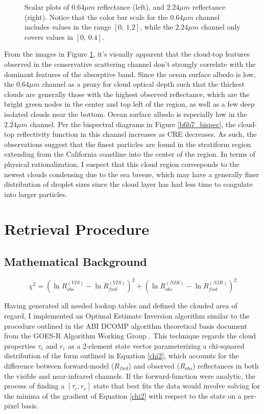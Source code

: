 \documentclass[12pt]{article}
\begin{document}
\begin{figure}[h!]
\begin{center}
{        }
    \end{center}
    \caption{Scalar plots of $0.64\mu m$ reflectance (left), and $2.24\mu m$ reflectance (right). Notice that the color bar scale for the $0.64\mu m$ channel includes values in the range $[0,\,1.2]$, while the $2.24\mu m$ channel only covers values in $[0,\,0.4]$.}
    \label{region_scalars}
\end{figure}

From the images in Figure \ref{region_scalars}, it's visually apparent that the cloud-top features observed in the conservative scattering channel don't strongly correlate with the dominant features of the absorptive band. Since the ocean surface albedo is low, the $0.64\mu m$ channel as a proxy for cloud optical depth such that the thickest clouds are generally those with the highest observed reflectance, which are the bright green nodes in the center and top left of the region, as well as a few deep isolated clouds near the bottom. Ocean surface albedo is especially low in the $2.24\mu m$ channel. Per the bispectral diagrams in Figure \ref{b6b7_bispec}, the cloud-top reflectivity function in this channel increases as CRE decreases. As such, the observations suggest that the finest particles are found in the stratiform region extending from the California coastline into the center of the region. In terms of physical rationalization, I suspect that this cloud region corresponds to the newest clouds condensing due to the sea breeze, which may have a generally finer distribution of droplet sizes since the cloud layer has had less time to coagulate into larger particles.

\section{Retrieval Procedure}

\subsection{Mathematical Background}

\begin{equation}\label{chi2}
    \chi^2 = \left(\ln{R^{(VIS)}_{obs}}-\ln{R^{(VIS)}_{fwd}}\right)^2 + \left(\ln{R^{(NIR)}_{obs}}-\ln{R^{(NIR)}_{fwd}}\right)^2
\end{equation}

Having generated all needed lookup tables and defined the clouded area of regard, I implemented an Optimal Estimate Inversion algorithm similar to the procedure outlined in the ABI DCOMP algorithm theoretical basis document from the GOES-R Algorithm Working Group \cite{uw_algorithm_nodate}. This technique regards the cloud properties $\tau_c$ and $r_e$ as a 2-element state vector parameterizing a chi-squared distribution of the form outlined in Equation \ref{chi2}, which accounts for the difference between forward-model ($R_{fwd}$) and observed ($R_{obs}$) reflectances in both the visible and near-infrared channels. If the forward-function were analytic, the process of finding a $[\tau_c, r_e]$ state that best fits the data would involve solving for the minima of the gradient of Equation \ref{chi2} with respect to the state on a per-pixel basis.
\end{document}

